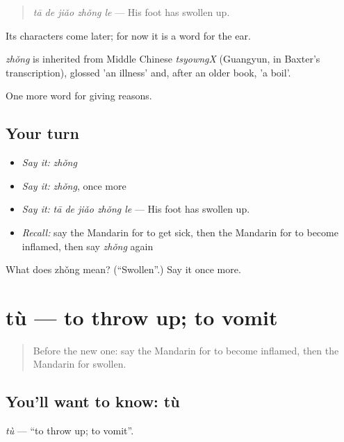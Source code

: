 \begin{quote}
\emph{tā de jiǎo zhǒng le} — His foot has swollen up.
\end{quote}

Its characters come later; for now it is a word for the ear.

\begin{cousinweb}
\emph{zhǒng} is inherited from Middle Chinese \emph{tsyowngX} (Guangyun, in Baxter's transcription), glossed 'an illness' and, after an older book, 'a boil'.
\end{cousinweb}

\begin{grammarlens}[title={What you've built}]
One more word for giving reasons.
\end{grammarlens}

\subsection*{Your turn}
\begin{itemize}
\raggedright
  \item \emph{Say it:} \emph{zhǒng}
  \item \emph{Say it:} \emph{zhǒng}, once more
  \item \emph{Say it:} \emph{tā de jiǎo zhǒng le} — His foot has swollen up.
  \item \emph{Recall:} say the Mandarin for to get sick, then the Mandarin for to become inflamed, then say \emph{zhǒng} again
\end{itemize}

\begin{tcolorbox}[breakable,colback=teal!4,colframe=teal!35!black,title={Before you move on}]
What does zhǒng mean? (\textquotedblleft{}Swollen\textquotedblright{}.) Say it once more.
\end{tcolorbox}
\section[tù]{tù — to throw up; to vomit}

\label{lesson:ZH-C240-tu}



\begin{quote}
Before the new one: say the Mandarin for to become inflamed, then the Mandarin for swollen.
\end{quote}

\subsection*{You'll want to know: tù}
\emph{tù} — \textquotedblleft{}to throw up; to vomit\textquotedblright{}.

